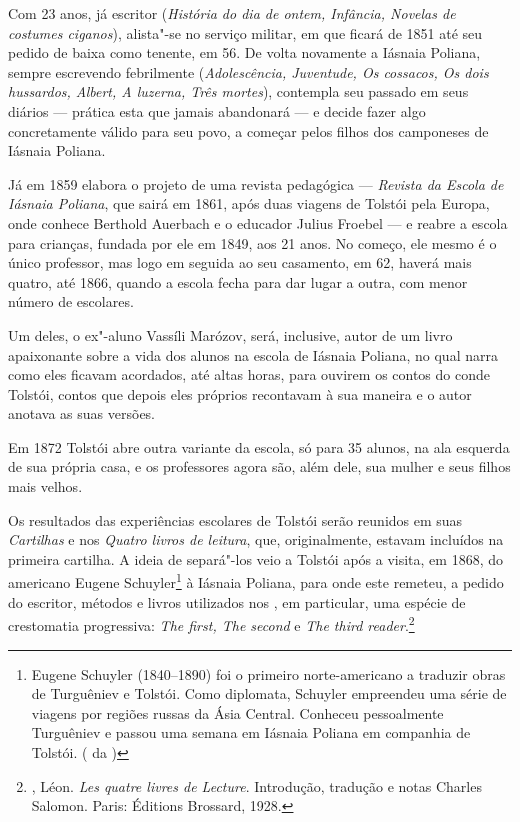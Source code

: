 Com 23 anos, já escritor (\emph{História do dia de ontem,
Infância, Novelas de costumes ciganos}), alista"-se no serviço
militar, em que ficará de 1851 até seu pedido de baixa como
tenente, em 56. De volta novamente a Iásnaia Poliana, sempre
escrevendo febrilmente (\emph{Adolescência, Juventude, Os
cossacos, Os dois hussardos, Albert, A luzerna, Três mortes}),
contempla seu passado em seus diários --- prática esta que jamais
abandonará --- e decide fazer algo concretamente válido para seu
povo, a começar pelos filhos dos camponeses de Iásnaia Poliana.

Já em 1859 elabora o projeto de uma revista pedagógica ---
\emph{Revista da Escola de Iásnaia Poliana}, que sairá
em 1861, após duas viagens de Tolstói pela Europa, onde
conhece Berthold Auerbach e o educador Julius Froebel ---
e reabre a escola para crianças, fundada por ele em 1849,
aos 21 anos. No começo, ele mesmo é o único professor, mas
logo em seguida ao seu casamento, em 62, haverá mais quatro,
até 1866, quando a escola fecha para dar lugar a outra, com
menor número de escolares.

Um deles, o ex"-aluno Vassíli Marózov, será, inclusive, autor de
um livro apaixonante sobre a vida dos alunos na escola de Iásnaia
Poliana, no qual narra como eles ficavam acordados, até altas
horas, para ouvirem os contos do conde Tolstói, contos que depois eles
próprios recontavam à sua maneira e o autor anotava as suas
versões.

Em 1872 Tolstói abre outra variante da escola, só para 35 alunos,
na ala esquerda de sua própria casa, e os professores agora são,
além dele, sua mulher e seus filhos mais velhos.

Os resultados das experiências escolares de Tolstói serão
reunidos em suas \emph{Cartilhas} e nos \emph{Quatro livros
de leitura}, que, originalmente, estavam incluídos na primeira
cartilha. A ideia de separá"-los veio a Tolstói após a visita,
em 1868, do americano Eugene Schuyler\footnote{Eugene Schuyler
(1840--1890) foi o primeiro norte-americano a traduzir obras de
Turguêniev e Tolstói. Como diplomata, Schuyler empreendeu uma
série de viagens por regiões russas da Ásia Central. Conheceu
pessoalmente Turguêniev e passou uma semana em Iásnaia Poliana
em companhia de Tolstói. ( da )} à Iásnaia Poliana,
para onde este remeteu, a pedido do escritor, métodos e livros
utilizados nos , em particular, uma espécie de
crestomatia progressiva: \emph{The first, The second} e \emph{The third
reader}.\footnote{, Léon. \emph{Les quatre livres de
Lecture}. Introdução, tradução e notas Charles Salomon. Paris:
Éditions Brossard, 1928.}

